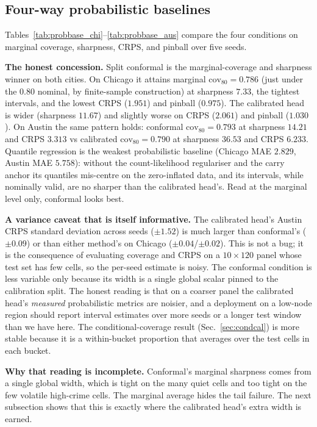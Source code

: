 \documentclass[11pt,conference]{IEEEtran}
\begin{document}
\subsection{Four-way probabilistic baselines}\label{sec:probbase}
Tables~\ref{tab:probbase_chi}--\ref{tab:probbase_aus} compare the four conditions
on marginal coverage, sharpness, CRPS, and pinball over five seeds.

\textbf{The honest concession.} Split conformal is the marginal-coverage and
sharpness winner on both cities. On Chicago it attains marginal
$\mathrm{cov}_{80}=0.786$ (just under the 0.80 nominal, by finite-sample
construction) at sharpness $7.33$, the tightest intervals, and the lowest CRPS
($1.951$) and pinball ($0.975$). The calibrated head is wider
(sharpness $11.67$) and slightly worse on CRPS ($2.061$) and pinball ($1.030$).
On Austin the same pattern holds: conformal $\mathrm{cov}_{80}=0.793$ at
sharpness $14.21$ and CRPS $3.313$ vs calibrated $\mathrm{cov}_{80}=0.790$ at
sharpness $36.53$ and CRPS $6.233$. Quantile regression is the weakest
probabilistic baseline (Chicago MAE $2.829$, Austin MAE $5.758$): without the
count-likelihood regulariser and the carry anchor its quantiles mis-centre on the
zero-inflated data, and its intervals, while nominally valid, are no sharper than
the calibrated head's. Read at the marginal level only, conformal looks best.

\textbf{A variance caveat that is itself informative.} The calibrated head's
Austin CRPS standard deviation across seeds ($\pm1.52$) is much larger than
conformal's ($\pm0.09$) or than either method's on Chicago
($\pm0.04$/$\pm0.02$). This is not a bug; it is the consequence of evaluating
coverage and CRPS on a $10\times120$ panel whose test set has few cells, so the
per-seed estimate is noisy. The conformal condition is less variable only
because its width is a single global scalar pinned to the calibration split.
The honest reading is that on a coarser panel the calibrated head's
\emph{measured} probabilistic metrics are noisier, and a deployment on a
low-node region should report interval estimates over more seeds or a longer
test window than we have here. The conditional-coverage result
(Sec.~\ref{sec:condcal}) is more stable because it is a within-bucket proportion
that averages over the test cells in each bucket.

\textbf{Why that reading is incomplete.} Conformal's marginal sharpness comes
from a single global width, which is tight on the many quiet cells and too tight
on the few volatile high-crime cells. The marginal average hides the tail
failure. The next subsection shows that this is exactly where the calibrated
head's extra width is earned.
\end{document}
